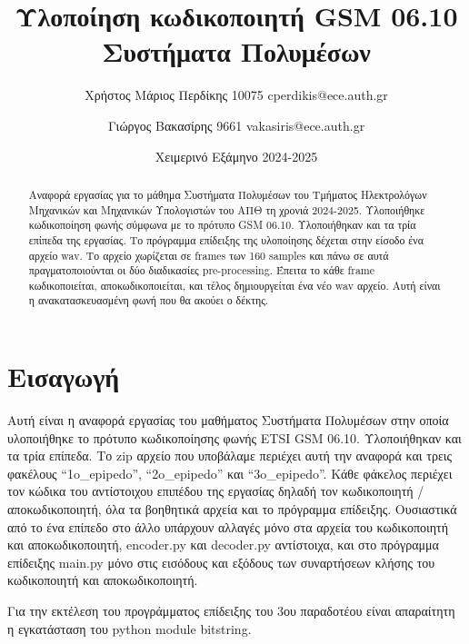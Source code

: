 \documentclass{article}
\title{Υλοποίηση κωδικοποιητή GSM 06.10 Συστήματα Πολυμέσων}
\date{Χειμερινό Εξάμηνο 2024-2025}
\author{Χρήστος Μάριος Περδίκης 10075 cperdikis@ece.auth.gr 
\and Γιώργος Βακασίρης 9661 vakasiris@ece.auth.gr}
\begin{document}
 
\maketitle 
\begin{abstract}
    Αναφορά εργασίας για το μάθημα
    Συστήματα Πολυμέσων του Τμήματος Ηλεκτρολόγων Μηχανικών και 
    Μηχανικών Υπολογιστών του ΑΠΘ τη χρονιά 2024-2025. Υλοποιήθηκε κωδικοποίηση
    φωνής σύμφωνα με το πρότυπο GSM 06.10\@. Υλοποιήθηκαν και τα τρία επίπεδα
    της εργασίας. Το πρόγραμμα επίδειξης της υλοποίησης δέχεται στην είσοδο ένα 
    αρχείο wav. Το αρχείο χωρίζεται σε frames των 160 samples και πάνω σε αυτά πραγματο\-ποιούνται 
    οι δύο διαδικασίες pre-processing. Έπειτα το κάθε frame κωδικοποιείται, 
    αποκωδικοποιείται, και τέλος δημιουργείται ένα νέο wav αρχείο. Αυτή  
    είναι η ανακατασκευασμένη φωνή που θα ακούει ο δέκτης.
\end{abstract}

\section{Εισαγωγή}

Αυτή είναι η αναφορά εργασίας του μαθήματος Συστήματα Πολυμέσων στην οποία 
υλοποιήθηκε το πρότυπο κωδικοποίησης φωνής ETSI GSM 06.10. Υλοποιήθηκαν 
και τα τρία επίπεδα. Το zip αρχείο που υποβάλαμε περιέχει αυτή την 
αναφορά και τρεις φακέλους ``1o\_epipedo'', ``2o\_epipedo'' και ``3o\_epipedo''. 
Κάθε φάκελος περιέχει τον κώδικα του αντίστοιχου επιπέδου της εργασίας δηλαδή
τον κωδικοποιητή \slash{} αποκωδικοποιητή, όλα τα βοηθητικά αρχεία 
και το πρόγραμμα επίδειξης. Ουσιαστικά από το ένα επίπεδο στο άλλο 
υπάρχουν αλλαγές μόνο στα αρχεία του κωδικοποιητή και αποκωδικοποιητή,
encoder.py και decoder.py αντίστοιχα, και στο πρόγραμμα επίδειξης main.py
μόνο στις εισόδους και εξόδους των συναρτήσεων κλήσης του κωδικοποιητή
και αποκωδικοποιητή. 

Για την εκτέλεση του προγράμματος επίδειξης του 3ου παραδοτέου είναι απαραίτητη 
η εγκατάσταση του python module bitstring.
\end{document}
